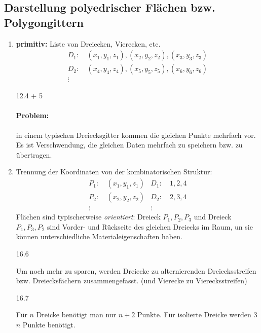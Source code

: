 \subsection{Darstellung polyedrischer Flächen bzw. Polygongittern}
\begin{enumerate}
 \item \textbf{primitiv:} Liste von Dreiecken, Vierecken, etc.
\begin{align*}
 D_1:\ &(x_1,y_1,z_1),(x_2,y_2,z_2),(x_3,y_3,z_3)\\
 D_2:\ &(x_4,y_4,z_4),(x_5,y_5,z_5),(x_6,y_6,z_6)\\
 \vdots\ 
\end{align*}
\begin{center}
 12.4 + 5
\end{center}
\paragraph*{Problem:} in einem typischen Dreiecksgitter kommen die gleichen Punkte mehrfach vor. Es ist
	Verschwendung, die gleichen Daten mehrfach zu speichern bzw. zu übertragen.
\item	Trennung der Koordinaten von der kombinatorischen Struktur:
	\begin{align*}
	 P_1:\ &(x_1,y_1,z_1) & D_1:\ &1,2,4\\
	 P_2:\ &(x_2,y_2,z_2) & D_2:\ &2,3,4\\
	 \vdots\ &		& \vdots\ 
	\end{align*}
	Flächen sind typischerweise \emph{orientiert}: Dreieck $P_1,P_2,P_3$ und Dreieck $P_1,P_3,P_2$ sind Vorder-
	und Rückseite des gleichen Dreiecks im Raum, un sie können unterschiedliche Materialeigenschaften haben.
	\begin{center}
	 16.6
	\end{center}
	Um noch mehr zu sparen, werden Dreiecke zu alternierenden Dreiecksstreifen bzw. Dreiecksfächern zusammengefasst.
	(und Vierecke zu Vierecksstreifen)
	\begin{center}
	 16.7
	\end{center}
	Für $n$ Dreicke benötigt man nur $n+2$ Punkte. Für isolierte Dreicke werden 3$n$ Punkte benötigt.
\end{enumerate}
